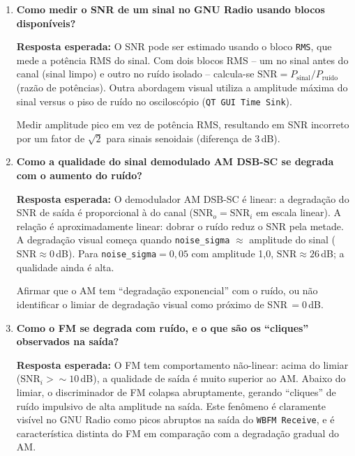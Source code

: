 \documentclass[11pt,a4paper]{article}
\begin{document}
\begin{enumerate}[label=\textbf{Q\arabic*.}, leftmargin=*, itemsep=1em]

  \item \textbf{Como medir o SNR de um sinal no GNU Radio usando blocos disponíveis?}

    \textbf{Resposta esperada:} O SNR pode ser estimado usando o bloco \texttt{RMS},
    que mede a potência RMS do sinal. Com dois blocos RMS -- um no sinal antes do
    canal (sinal limpo) e outro no ruído isolado -- calcula-se
    $\text{SNR} = P_\text{sinal} / P_\text{ruído}$ (razão de potências). Outra abordagem
    visual utiliza a amplitude máxima do sinal versus o piso de ruído no osciloscópio
    (\texttt{QT GUI Time Sink}).

    \begin{nota}
      Medir amplitude pico em vez de potência RMS, resultando em SNR incorreto por
      um fator de $\sqrt{2}$ para sinais senoidais (diferença de $3$\,dB).
    \end{nota}

  \item \textbf{Como a qualidade do sinal demodulado AM DSB-SC se degrada com o aumento do ruído?}

    \textbf{Resposta esperada:} O demodulador AM DSB-SC é linear: a degradação do SNR
    de saída é proporcional à do canal ($\text{SNR}_o = \text{SNR}_i$ em escala linear).
    A relação é aproximadamente linear: dobrar o ruído reduz o SNR pela metade.
    A degradação visual começa quando \texttt{noise\_sigma} $\approx$ amplitude do sinal
    ($\text{SNR} \approx 0$\,dB). Para \texttt{noise\_sigma}$= 0{,}05$ com amplitude 1,0,
    $\text{SNR} \approx 26$\,dB; a qualidade ainda é alta.

    \begin{nota}
      Afirmar que o AM tem ``degradação exponencial'' com o ruído, ou não identificar
      o limiar de degradação visual como próximo de SNR$\,= 0$\,dB.
    \end{nota}

  \item \textbf{Como o FM se degrada com ruído, e o que são os ``cliques'' observados na saída?}

    \textbf{Resposta esperada:} O FM tem comportamento não-linear: acima do limiar
    ($\text{SNR}_i > \sim 10$\,dB), a qualidade de saída é muito superior ao AM.
    Abaixo do limiar, o discriminador de FM colapsa abruptamente, gerando ``cliques''
    de ruído impulsivo de alta amplitude na saída. Este fenômeno é claramente visível
    no GNU Radio como picos abruptos na saída do \texttt{WBFM Receive}, e é característica
    distinta do FM em comparação com a degradação gradual do AM.


\end{enumerate}
\end{document}
